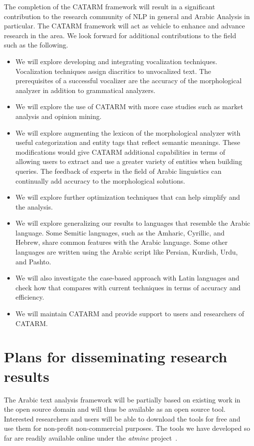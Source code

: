 \documentclass[12pt]{article}
\begin{document}
The completion of the CATARM framework will result in a 
significant contribution to the research community of 
NLP in general and Arabic Analysis in particular. 
The CATARM framework will act as vehicle to enhance and advance 
research in the area. 
We look forward for additional contributions to the field 
such as the following.
\begin{itemize}
\item We will explore developing and integrating vocalization
techniques. 
Vocalization techniques assign diacritics to unvocalized text. 
The prerequisites of a successful vocalizer are the accuracy of 
the morphological analyzer in addition to grammatical analyzers. 
\item We will explore the use of CATARM with more case studies
such as market analysis and opinion mining.
\item We will explore augmenting the lexicon of the
morphological analyzer with useful categorization and entity 
tags that reflect semantic meanings. 
These modifications would give CATARM additional capabilities in 
terms of allowing users to extract and use a greater variety of 
entities when building queries. 
The feedback of experts in the field of Arabic linguistics can 
continually add accuracy to the morphological solutions.  
\item We will explore further optimization techniques
that can help simplify and the analysis. 
\item We will explore generalizing our results to languages 
that resemble the Arabic language. 
Some Semitic languages, such as the Amharic, Cyrillic, and Hebrew,
share common features with the Arabic 
language. Some other languages are written using the 
Arabic script like Persian, Kurdish, Urdu, and Pashto. 
\item We will also investigate the case-based approach with
Latin languages and check how that compares with current techniques
in terms of accuracy and efficiency.
\item We will maintain CATARM and provide support to users and 
researchers of CATARM.
\end{itemize}


\section{Plans for disseminating research results}
\label{s:dissem}

The Arabic text analysis framework will be partially based on 
existing work in the open source domain and will thus be available 
as an open source tool. 
Interested researchers and users will be able to download the 
tools for free and use them for non-profit non-commercial 
purposes.  
The tools we have developed so far are readily available 
online under the {\em atmine} project~\cite{ATMine09}.
\end{document}
